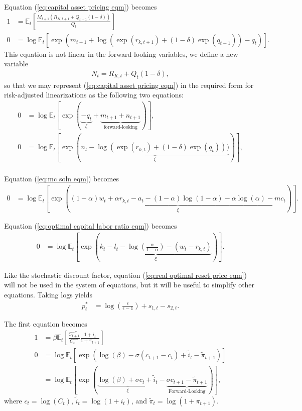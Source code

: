 \documentclass[12 pt, oneside]{article}
\theoremstyle{definition}
\theoremstyle{definition}
\theoremstyle{definition}
\newcommand{\E}{\mathbb{E}}
\begin{document}
Equation (\ref{eq:capital asset pricing eqm}) becomes
\begin{align*}
  1 & = \E_t\left[\frac{M_{t + 1} (R_{K, t + 1} + Q_{t + 1}(1 - \delta))}{Q_t}\right]\\
  0 & = \log\E_t\left[\exp\left(m_{t + 1} + \log(\exp(r_{k, t + 1}) + (1-\delta)\exp(q_{t + 1})) - q_t\right)\right].
\end{align*}
This equation is not linear in the forward-looking variables, we define a new variable
\begin{align}\label{eq:Omega defn}
  N_t = R_{K, t} + Q_t(1 - \delta),
\end{align}
so that we may represent (\ref{eq:capital asset pricing eqm}) in the required form for risk-adjusted linearizations as the following two equations:
\begin{align*}
  0 & = \log\E_t\left[\exp\left(\underbrace{-q_t}_{\xi} + \underbrace{m_{t + 1} + n_{t + 1}}_{\text{forward-looking}}\right)\right],\\
  0 & = \log\E_t\left[\exp\left(\underbrace{n_t - \log(\exp(r_{k, t}) +  (1 - \delta)\exp(q_t)))}_{\xi} \right)\right],\\
\end{align*}

Equation (\ref{eq:mc soln eqm}) becomes
\begin{align*}
  0 & = \log\E_t\left[\exp\left(\underbrace{(1 - \alpha)w_t + \alpha r_{k, t} - a_t -(1 - \alpha)\log(1 - \alpha) - \alpha \log(\alpha) - mc_t}_{\xi} \right)\right].
\end{align*}

Equation (\ref{eq:optimal capital labor ratio eqm}) becomes
\begin{align*}
  0 & = \log\E_t\left[\exp\left(\underbrace{k_t - l_t - \log\left(\frac{\alpha}{1 - \alpha}\right) - (w_t - r_{k, t})}_{\xi} \right)\right].
\end{align*}

Like the stochastic discount factor, equation (\ref{eq:real optimal reset price eqm}) will not be used in the system of equations, but it will be useful to simplify other equations. Taking logs yields
\begin{align*}
  p_t^* & = \log\left(\frac{\epsilon}{\epsilon - 1}\right) + s_{1, t} - s_{2, t}.
\end{align*}


The first equation becomes
\begin{align*}
  1 & = \beta \E_t\left[\frac{C_{t + 1}^{-\sigma}}{C_t^{-\sigma}}\frac{ 1 + i_t}{1 + \pi_{t + 1}}\right]\\
  0 & = \log\E_t\left[\exp\left(\log(\beta) -\sigma (c_{t + 1} - c_t) + \tilde{i}_t - \tilde{\pi}_{t + 1} \right)\right]\\
    & = \log\E_t\left[\exp\left(\underbrace{\log(\beta) + \sigma c_t + \tilde{i}_t}_{\xi} - \underbrace{\sigma c_{t + 1} - \tilde{\pi}_{t + 1}}_{\text{Forward-Looking}} \right)\right],
\end{align*}
where $c_t = \log(C_t)$, $\tilde{i}_t = \log(1 + i_t)$, and $\tilde{\pi}_t = \log(1 + \pi_{t + 1})$.
\end{document}
